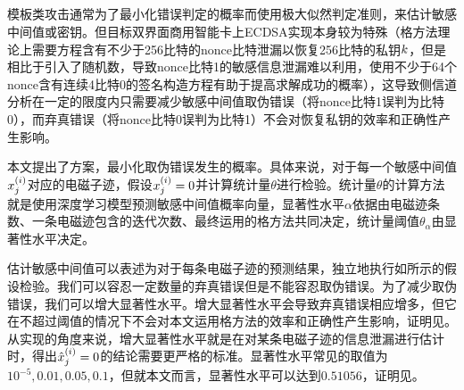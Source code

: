 {{	\subsection{\jiashejianyanguji}

	模板类攻击通常为了最小化错误判定的概率而使用极大似然判定准则，来估计敏感中间值或密钥。但目标双界面商用智能卡上ECDSA实现本身较为特殊（格方法理论上需要方程含有不少于256比特的nonce比特泄漏以恢复256比特的私钥$k$，但是相比于引入了随机数，导致nonce比特1的敏感信息泄漏难以利用，使用不少于64个nonce含有连续4比特0的签名构造方程有助于提高求解成功的概率），这导致侧信道分析在一定的限度内只需要减少敏感中间值取伪错误（将nonce比特1误判为比特0），而弃真错误（将nonce比特0误判为比特1）不会对恢复私钥的效率和正确性产生影响。
	
	本文提出了\jiashejianyanguji 方案，最小化取伪错误发生的概率。具体来说，对于每一个敏感中间值$x^{(i)}_j$对应的电磁子迹，假设$x^{(i)}_j=0$并计算统计量$\theta$进行检验。统计量$\theta$的计算方法就是使用深度学习模型预测敏感中间值概率向量，显著性水平$\alpha$依据由电磁迹条数、一条电磁迹包含的迭代次数、最终运用的格方法共同决定，统计量阈值$\theta_{\alpha}$由显著性水平决定。
	
	
	估计敏感中间值可以表述为对于每条电磁子迹的预测结果，独立地执行如所示的假设检验。我们可以容忍一定数量的弃真错误但是不能容忍取伪错误。为了减少取伪错误，我们可以增大显著性水平。增大显著性水平会导致弃真错误相应增多，但它在不超过阈值的情况下不会对本文运用格方法的效率和正确性产生影响，证明见。从实现的角度来说，增大显著性水平就是在对某条电磁子迹的信息泄漏进行估计时，得出$\hat{x}^{(i)}_j=0$的结论需要更严格的标准。显著性水平常见的取值为$10^{-5},0.01,0.05,0.1$，但就本文而言，显著性水平可以达到$0.51056$，证明见。
	
}}
